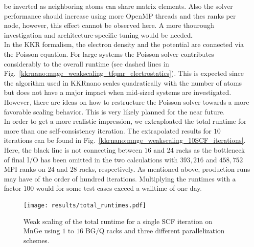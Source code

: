 be inverted as neighboring atoms can share matrix elements.
Also the solver performance should increase using more OpenMP threads and thes ranks per node, 
however, this effect cannot be observed here. A more thourough investigation and 
architecture-specific tuning would be needed.
\\
In the KKR formalism, the electron density and the potential are connected via the Poisson equation. 
For large systems the Poisson solver contributes considerably to the overall runtime
(see dashed lines in Fig.~\ref{kkrnano:mnge_weakscaling_tfqmr_electrostatics}). 
This is expected since the algorithm used in KKRnano scales quadratically with the number of atoms 
but does not have a major impact when mid-sized systems are investigated.
However, there are ideas on how to restructure the Poisson solver towards a more favorable scaling behavior.
This is very likely planned for the near future.
\\
In order to get a more realistic impression, we extraploated the total runtime
for more than one self-consistency iteration. The extrapolated results for $10$ iterations can be found in Fig.~\ref{kkrnano:mnge_weakscaling_10SCF_iterations}.
Here, the black line is not connecting between $16$ and $24$ racks as the bottleneck of final I/O
has been omitted in the two calculations with $393,216$ and $458,752$ MPI ranks on $24$ and $28$ racks, respectively.
As mentioned above, production runs may have of the order of hundred iterations.
Multiplying the runtimes with a factor $100$ would for some test cases exceed a walltime of one day.



\begin{figure}[h!]
\begin{center}
  \texttt{[image: results/total\_runtimes.pdf]}
  \caption{Weak scaling of the total runtime for a single SCF iteration on MnGe using $1$ to $16$ BG/Q racks and three different parallelization schemes.}
  \label{kkrnano:mnge_weakscaling_total}
\end{center}
\end{figure}



